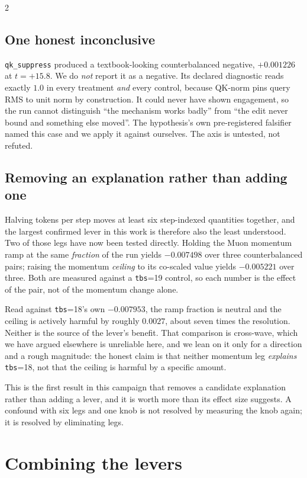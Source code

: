 \documentclass[10pt]{article}
\begin{document}
\begin{multicols}{2}
\subsection{One honest inconclusive}

\texttt{qk\_suppress} produced a textbook-looking counterbalanced negative, $+0.001226$ at
$t=+15.8$. We do \emph{not} report it as a negative. Its declared diagnostic reads exactly
$1.0$ in every treatment \emph{and} every control, because QK-norm pins query RMS to unit
norm by construction. It could never have shown engagement, so the run cannot distinguish
``the mechanism works badly'' from ``the edit never bound and something else moved''. The
hypothesis's own pre-registered falsifier named this case and we apply it against
ourselves. The axis is untested, not refuted.

\subsection{Removing an explanation rather than adding one}
\label{sec:momentum}

Halving tokens per step moves at least six step-indexed quantities together, and the
largest confirmed lever in this work is therefore also the least understood. Two of those
legs have now been tested directly. Holding the Muon momentum ramp at the same
\emph{fraction} of the run yields $-0.007498$ over three counterbalanced pairs; raising the
momentum \emph{ceiling} to its co-scaled value yields $-0.005221$ over three. Both are
measured against a \texttt{tbs}=19 control, so each number is the effect of the pair, not of
the momentum change alone.

Read against \texttt{tbs}=18's own $-0.007953$, the ramp fraction is neutral and the ceiling
is actively harmful by roughly $0.0027$, about seven times the resolution. Neither is the
source of the lever's benefit. That comparison is cross-wave, which we have argued
elsewhere is unreliable here, and we lean on it only for a direction and a rough magnitude:
the honest claim is that neither momentum leg \emph{explains} \texttt{tbs}=18, not that the
ceiling is harmful by a specific amount.

This is the first result in this campaign that removes a candidate explanation rather than
adding a lever, and it is worth more than its effect size suggests. A confound with six legs
and one knob is not resolved by measuring the knob again; it is resolved by eliminating legs.

\section{Combining the levers}
\label{sec:stack}


\end{multicols}
\end{document}
